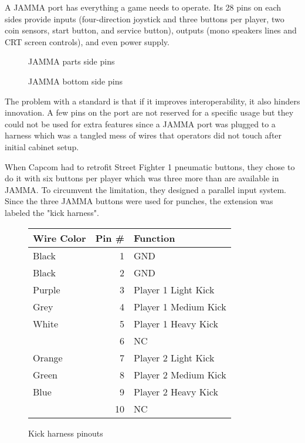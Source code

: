 A JAMMA port has everything a game needs to operate. Its 28 pins on each sides provide inputs (four-direction joystick and three buttons per player, two coin sensors, start button, and service button), outputs (mono speakers lines and CRT screen controls), and even power supply.

 \begin{figure}[H]
\caption*{JAMMA parts side pins}
\end{figure}

 \begin{figure}[H]
\caption*{JAMMA bottom side pins}
\end{figure}

The problem with a standard is that if it improves interoperability, it also hinders innovation. A few pins on the port are not reserved for a specific usage but they could not be used for extra features since a JAMMA port was plugged to a harness which was a tangled mess of wires that operators did not touch after initial cabinet setup.

When Capcom had to retrofit Street Fighter 1 pneumatic buttons, they chose to do it with six buttons per player which was three more than are available in JAMMA. To circumvent the limitation, they designed a parallel input system. Since the three JAMMA buttons were used for punches, the extension was labeled the "kick harness".

\begin{figure}[H]

\begin{tabularx}{\textwidth}{lrX}
  \toprule    
  \textbf{Wire Color } & \textbf{ Pin \#}  & \textbf{Function } \\               
  \toprule   
  Black & 1 & GND \\
  Black & 2 & GND \\
  \toprule   
  Purple & 3 & Player 1 Light Kick \\
  Grey & 4 & Player 1 Medium Kick \\
  White & 5 & Player 1 Heavy Kick \\
  \toprule   
  & 6 & NC \\
  \toprule   
  Orange & 7 & Player 2 Light Kick\\
  Green & 8 & Player 2 Medium Kick\\
  Blue & 9 & Player 2 Heavy Kick\\
  \toprule   
  & 10 & NC \\
  \toprule   
\end{tabularx}
\caption*{Kick harness pinouts}
\end{figure}










